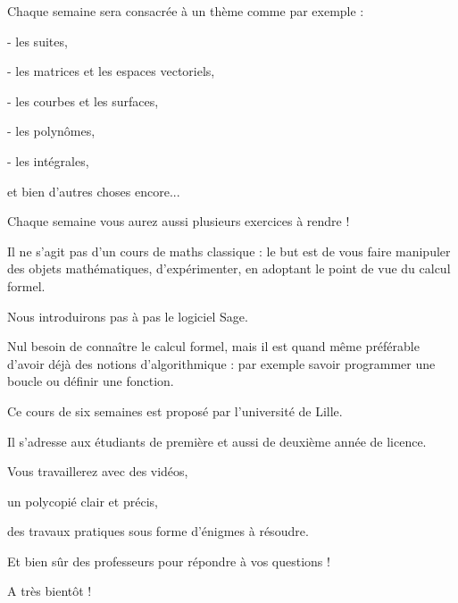 %
%
%
%
%

\change

Chaque semaine sera consacrée à un thème comme par exemple :

- les suites,

\change

- les matrices et les espaces vectoriels,

\change

- les courbes et les surfaces,

\change

- les polynômes,

\change


- les intégrales,

et bien d'autres choses encore...

\change


Chaque semaine vous aurez aussi plusieurs exercices à rendre ! 

\change
 
Il ne s'agit pas d'un cours de maths classique : le but est de vous faire manipuler des objets mathématiques, 
d'expérimenter, en adoptant le point de vue du calcul formel.

\change

Nous 
introduirons pas à pas le logiciel Sage. 

\change

Nul besoin de connaître le calcul formel, mais
il est quand même préférable d'avoir déjà des notions d'algorithmique :
par exemple savoir programmer une boucle ou définir une fonction.



\change


\change

Ce cours de six semaines est proposé par l'université de Lille.

Il s'adresse aux étudiants de première et aussi de deuxième année de licence.

\change

Vous travaillerez avec des vidéos,

\change

un polycopié clair et précis,


\change

des travaux pratiques sous forme d'énigmes à résoudre.


\change

Et bien sûr des professeurs pour répondre à vos questions !

A très bientôt !



